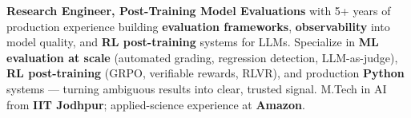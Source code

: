 \documentclass[letter,10pt]{article}
\begin{document}

\textbf{Research Engineer, Post-Training Model Evaluations} with 5+ years of production experience building \textbf{evaluation frameworks}, \textbf{observability} into model quality, and \textbf{RL post-training} systems for LLMs.
Specialize in \textbf{ML evaluation at scale} (automated grading, regression detection, LLM-as-judge), \textbf{RL post-training} (GRPO, verifiable rewards, RLVR), and production \textbf{Python} systems — turning ambiguous results into clear, trusted signal.
M.Tech in AI from \textbf{IIT Jodhpur}; applied-science experience at \textbf{Amazon}.
\end{document}

